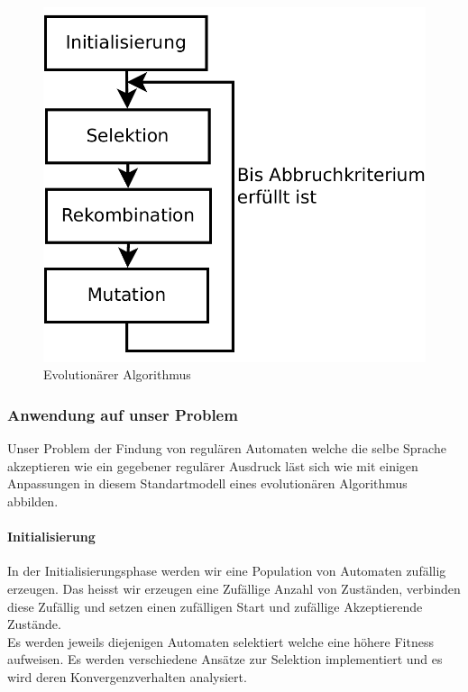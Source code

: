 \begin{figure}[h]
  \centering
  \includegraphics{images/evolutionaerer_algorithmus.pdf}
  \caption[Evolutionärer Algorithmus]{Evolutionärer Algorithmus}
  \label{fig:endlicher_automat}
\end{figure}

\subsubsection{Anwendung auf unser Problem}
Unser Problem der Findung von regulären Automaten welche die selbe Sprache akzeptieren wie ein gegebener regulärer Ausdruck läst sich wie mit einigen Anpassungen in diesem Standartmodell eines evolutionären Algorithmus abbilden.

\paragraph{Initialisierung}
In der Initialisierungsphase werden wir eine Population von Automaten zufällig erzeugen. Das heisst wir erzeugen eine Zufällige Anzahl von Zuständen, verbinden diese Zufällig und setzen einen zufälligen Start und zufällige Akzeptierende Zustände.\\

Es werden jeweils diejenigen Automaten selektiert welche eine höhere Fitness aufweisen. Es werden verschiedene Ansätze zur Selektion implementiert und es wird deren Konvergenzverhalten analysiert.\\ 

